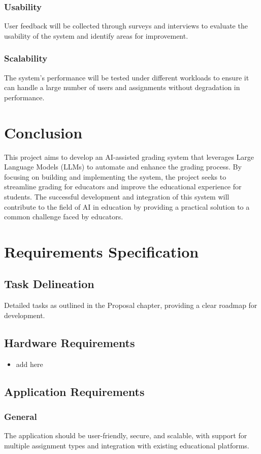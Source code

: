 \documentclass[ms,twoside,print]{nuthesis}
\begin{document}
\subsection{Usability}
User feedback will be collected through surveys and interviews to evaluate the usability of the system and identify areas for improvement.

\subsection{Scalability}
The system's performance will be tested under different workloads to ensure it can handle a large number of users and assignments without degradation in performance.

\chapter{Conclusion}
This project aims to develop an AI-assisted grading system that leverages Large Language Models (LLMs) to automate and enhance the grading process. By focusing on building and implementing the system, the project seeks to streamline grading for educators and improve the educational experience for students. The successful development and integration of this system will contribute to the field of AI in education by providing a practical solution to a common challenge faced by educators.

\appendix
\chapter{Requirements Specification}
\section{Task Delineation}
Detailed tasks as outlined in the Proposal chapter, providing a clear roadmap for development.

\section{Hardware Requirements}
\begin{itemize}
    \item add here
\end{itemize}

\section{Application Requirements}
\subsection{General}
The application should be user-friendly, secure, and scalable, with support for multiple assignment types and integration with existing educational platforms.
\end{document}
